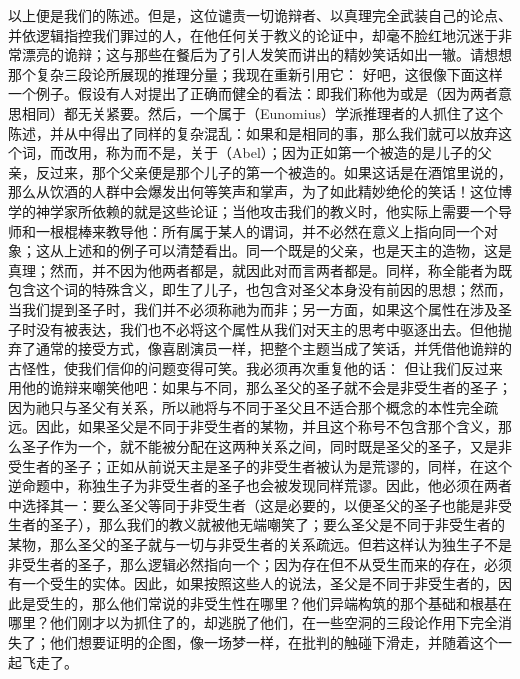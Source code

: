 以上便是我们的陈述。但是，这位谴责一切诡辩者、以真理完全武装自己的论点、并依逻辑指控我们罪过的人，在他任何关于教义的论证中，却毫不脸红地沉迷于非常漂亮的诡辩；这与那些在餐后为了引人发笑而讲出的精妙笑话如出一辙。请想想那个复杂三段论所展现的推理分量；我现在重新引用它： 好吧，这很像下面这样一个例子。假设有人对提出了正确而健全的看法：即我们称他为或是（因为两者意思相同）都无关紧要。然后，一个属于（Eunomius）学派推理者的人抓住了这个陈述，并从中得出了同样的复杂混乱：如果和是相同的事，那么我们就可以放弃这个词，而改用，称为而不是，关于（Abel）；因为正如第一个被造的是儿子的父亲，反过来，那个父亲便是那个儿子的第一个被造的。如果这话是在酒馆里说的，那么从饮酒的人群中会爆发出何等笑声和掌声，为了如此精妙绝伦的笑话！这位博学的神学家所依赖的就是这些论证；当他攻击我们的教义时，他实际上需要一个导师和一根棍棒来教导他：所有属于某人的谓词，并不必然在意义上指向同一个对象；这从上述和的例子可以清楚看出。同一个既是的父亲，也是天主的造物，这是真理；然而，并不因为他两者都是，就因此对而言两者都是。同样，称全能者为既包含这个词的特殊含义，即生了儿子，也包含对圣父本身没有前因的思想；然而，当我们提到圣子时，我们并不必须称祂为而非；另一方面，如果这个属性在涉及圣子时没有被表达，我们也不必将这个属性从我们对天主的思考中驱逐出去。但他抛弃了通常的接受方式，像喜剧演员一样，把整个主题当成了笑话，并凭借他诡辩的古怪性，使我们信仰的问题变得可笑。我必须再次重复他的话： 但让我们反过来用他的诡辩来嘲笑他吧：如果与不同，那么圣父的圣子就不会是非受生者的圣子；因为祂只与圣父有关系，所以祂将与不同于圣父且不适合那个概念的本性完全疏远。因此，如果圣父是不同于非受生者的某物，并且这个称号不包含那个含义，那么圣子作为一个，就不能被分配在这两种关系之间，同时既是圣父的圣子，又是非受生者的圣子；正如从前说天主是圣子的非受生者被认为是荒谬的，同样，在这个逆命题中，称独生子为非受生者的圣子也会被发现同样荒谬。因此，他必须在两者中选择其一：要么圣父等同于非受生者（这是必要的，以便圣父的圣子也能是非受生者的圣子），那么我们的教义就被他无端嘲笑了；要么圣父是不同于非受生者的某物，那么圣父的圣子就与一切与非受生者的关系疏远。但若这样认为独生子不是非受生者的圣子，那么逻辑必然指向一个；因为存在但不从受生而来的存在，必须有一个受生的实体。因此，如果按照这些人的说法，圣父是不同于非受生者的，因此是受生的，那么他们常说的非受生性在哪里？他们异端构筑的那个基础和根基在哪里？他们刚才以为抓住了的，却逃脱了他们，在一些空洞的三段论作用下完全消失了；他们想要证明的企图，像一场梦一样，在批判的触碰下滑走，并随着这个一起飞走了。\par

